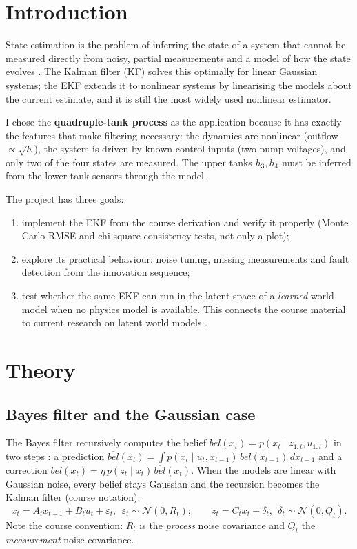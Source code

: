 \documentclass[11pt]{article}
\begin{document}
\section{Introduction}
State estimation is the problem of inferring the state of a system that cannot be measured directly from noisy, partial measurements and a model of how the state evolves \cite{thrun2005}. The Kalman filter (KF) \cite{kalman1960} solves this optimally for linear Gaussian systems; the EKF extends it to nonlinear systems by linearising the models about the current estimate, and it is still the most widely used nonlinear estimator.

I chose the \textbf{quadruple-tank process} \cite{johansson2000} as the application because it has exactly the features that make filtering necessary: the dynamics are nonlinear (outflow $\propto\sqrt{h}$), the system is driven by known control inputs (two pump voltages), and only two of the four states are measured. The upper tanks $h_3,h_4$ must be inferred from the lower-tank sensors through the model.

The project has three goals:
\begin{enumerate}\itemsep0pt
\item implement the EKF from the course derivation and verify it properly (Monte Carlo RMSE and chi-square consistency tests, not only a plot);
\item explore its practical behaviour: noise tuning, missing measurements and fault detection from the innovation sequence;
\item test whether the same EKF can run in the latent space of a \emph{learned} world model when no physics model is available. This connects the course material to current research on latent world models \cite{assran2023ijepa,assran2025vjepa2}.
\end{enumerate}

\section{Theory}
\subsection{Bayes filter and the Gaussian case}
The Bayes filter recursively computes the belief $bel(x_t)=p(x_t\mid z_{1:t},u_{1:t})$ in two steps \cite{thrun2005}: a prediction $\overline{bel}(x_t)=\int p(x_t\mid u_t,x_{t-1})\,bel(x_{t-1})\,dx_{t-1}$ and a correction $bel(x_t)=\eta\,p(z_t\mid x_t)\,\overline{bel}(x_t)$. When the models are linear with Gaussian noise, every belief stays Gaussian and the recursion becomes the Kalman filter (course notation):
\begin{equation}
x_t = A_t x_{t-1}+B_t u_t+\varepsilon_t,\ \ \varepsilon_t\sim\mathcal N(0,R_t);\qquad z_t=C_t x_t+\delta_t,\ \ \delta_t\sim\mathcal N(0,Q_t).
\end{equation}
Note the course convention: $R_t$ is the \emph{process} noise covariance and $Q_t$ the \emph{measurement} noise covariance.
\end{document}
